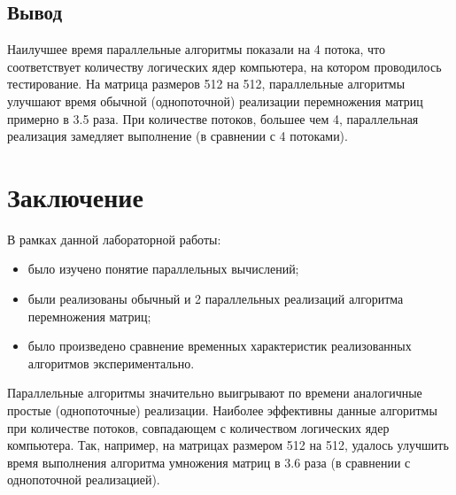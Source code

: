 \documentclass[12pt]{report}
\begin{document}
\section{Вывод}

Наилучшее время параллельные алгоритмы показали на 4 потока, что соответствует количеству логических ядер компьютера, на котором проводилось тестирование. На матрица размеров 512 на 512, параллельные алгоритмы улучшают время обычной (однопоточной) реализации перемножения матриц примерно в 3.5 раза. При количестве потоков, большее чем 4, параллельная реализация замедляет выполнение (в сравнении с 4 потоками).

\chapter*{Заключение}

В рамках данной лабораторной работы:

\begin{itemize}
	\item было изучено понятие параллельных вычислений;

	\item были реализованы обычный и  2 параллельных реализаций алгоритма перемножения матриц;

	\item было произведено сравнение временных характеристик реализованных алгоритмов экспериментально.
\end{itemize}

Параллельные алгоритмы значительно выигрывают по времени аналогичные простые (однопоточные) реализации. Наиболее эффективны данные алгоритмы при количестве потоков, совпадающем с количеством логических ядер компьютера. Так, например, на матрицах размером 512 на 512, удалось улучшить время выполнения алгоритма умножения матриц в 3.6 раза (в сравнении с однопоточной реализацией).



\end{document}
